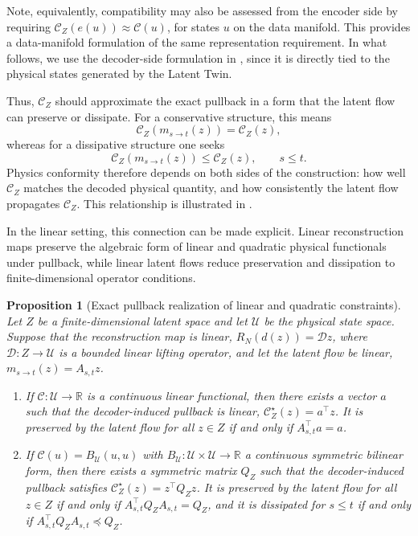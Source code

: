 \documentclass[a4paper,fleqn]{cas-sc}
\theoremstyle{thmstyleone}%
\newtheorem{proposition}[theorem]{Proposition}%
\theoremstyle{thmstyletwo}%
\theoremstyle{thmstylethree}%
\begin{document}
Note, equivalently, compatibility may also be assessed from the encoder side by requiring $\mathcal C_Z(e(u)) \approx \mathcal C(u)$, for states $u$ on the data manifold. This provides a data-manifold formulation of the same representation requirement. In what follows, we use the decoder-side formulation in , since it is directly tied to the physical states generated by the Latent Twin.

Thus, $\mathcal C_Z$ should approximate the exact pullback  in a form that the latent flow can preserve or dissipate. For a conservative structure, this means
\[
    \mathcal C_Z(m_{s\to t}(z)) = \mathcal C_Z(z),
\]
whereas for a dissipative structure one seeks
\[
    \mathcal C_Z(m_{s\to t}(z)) \le \mathcal C_Z(z), \qquad s\le t .
\]
Physics conformity therefore depends on both sides of the construction: how well $\mathcal C_Z$ matches the decoded physical quantity, and how consistently the latent flow propagates $\mathcal C_Z$. This relationship is illustrated in .

In the linear setting, this connection can be made explicit. Linear reconstruction maps preserve the algebraic form of linear and quadratic physical functionals under pullback, while linear latent flows reduce preservation and dissipation to finite-dimensional operator conditions.

\begin{proposition}[Exact pullback realization of linear and quadratic constraints] \label{prop:affine_linear_exact_constraints}
Let $Z$ be a finite-dimensional latent space and let $\mathcal U$ be the physical state space. Suppose that the reconstruction map is linear, $R_N(d(z))=\mathcal D z$, where $\mathcal D:Z\to\mathcal U$ is a bounded linear lifting operator, and let the latent flow be linear, $m_{s\to t}(z)=A_{s,t}z$.

\begin{enumerate}
    \item If $\mathcal C:\mathcal U\to\mathbb R$ is a continuous linear functional, then there exists a vector $a$ such that the decoder-induced pullback is linear, $\mathcal C_Z^\star(z)=a^\top z$. It is preserved by the latent flow for all $z\in Z$ if and only if $A_{s,t}^\top a=a$.

    \item If $\mathcal C(u)=B_{\mathcal U}(u,u)$ with $B_{\mathcal U}:\mathcal U\times\mathcal U\to\mathbb R$ a continuous symmetric bilinear form, then there exists a symmetric matrix $Q_Z$ such that the decoder-induced pullback satisfies $\mathcal C_Z^\star(z)=z^\top Q_Zz$. It is preserved by the latent flow for all $z\in Z$ if and only if $A_{s,t}^\top Q_ZA_{s,t}=Q_Z$, and it is dissipated for $s\le t$ if and only if $A_{s,t}^\top Q_ZA_{s,t}\preceq Q_Z$.
\end{enumerate}
\end{proposition}
\end{document}
